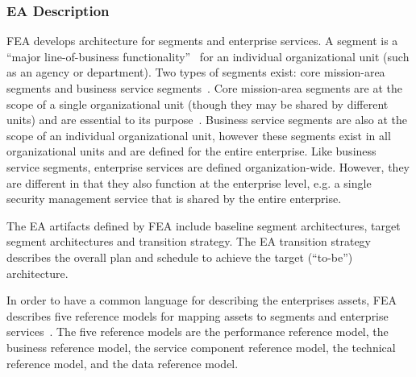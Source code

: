 \subsubsection{EA Description}
FEA develops architecture for segments and enterprise services. A segment is a ``major line-of-business functionality''~\cite{sessions2007} for an individual organizational unit (such as an agency or department). Two types of segments exist: core mission-area segments and business service segments~\cite{FEA_PMO2007}. Core mission-area segments are at the scope of a single organizational unit (though they may be shared by different units) and are essential to its purpose~\cite{sessions2007,FEA_PMO2007}. Business service segments are also at the scope of an individual organizational unit, however these segments exist in all organizational units and are defined for the entire enterprise. Like business service segments, enterprise services are defined organization-wide. However, they are different in that they also function at the enterprise level, e.g. a single security management service that is shared by the entire enterprise. 

The EA artifacts defined by FEA include  baseline segment architectures, target segment architectures and transition strategy. The EA transition strategy describes the overall plan and schedule to achieve the target (``to-be'') architecture.

%
%

In order to have a common language for describing the enterprises assets, FEA describes five reference models for mapping assets to segments and enterprise services~\cite{FEA_PMO2007}. The five reference models are the performance reference model, the business reference model, the service component reference model, the technical reference model, and the data reference model. 

